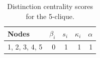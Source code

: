 \begin{table}
\centering
\caption{\label{tab:clique5}Distinction centrality scores for the 5-clique.}
\centering
\begin{tabular}[t]{lrrrr}
\toprule
Nodes & $\beta_i$ & $s_i$ & $\kappa_i$ & $\alpha$\\
\midrule
1, 2, 3, 4, 5 & 0 & 1 & 1 & 1\\
\bottomrule
\end{tabular}
\end{table}
